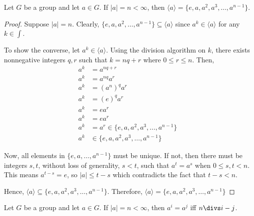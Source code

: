     \begin{thm}
        Let \(G\) be a group and let \(a\in G\). If \(|a| = n < \infty\), then \(\langle a \rangle = \{e, a, a^2, a^3, \ldots, a^{n - 1}\}\).
    \end{thm}

    \begin{proof}
        Suppose \(|a| = n\). Clearly, \(\{e, a, a^2, \ldots, a^{n -1}\} \subseteq \langle a \rangle\) since \(a^k \in \langle a \rangle\) for any \(k\in\int\).

        To show the converse, let \(a^k \in \langle a \rangle\). Using the division algorithm on \(k\), there exists nonnegative integers \(q, r\) such that \(k = nq + r\) where \(0 \leq r \leq n\). Then,
        \begin{align*}
            a^k &= a^{nq + r} \\
            a^k &= a^{nq}a^r \\
            a^k &= (a^{n})^q a^r \\
            a^k &= (e)^q a^r \\
            a^k &= e a^r \\
            a^k &= e a^r \\
            a^k &= a^r \in \{e, a, a^2, a^3, \ldots, a^{n - 1}\} \\
            a^k &\in \{e, a, a^2, a^3, \ldots, a^{n - 1}\}
        \end{align*}

        Now, all elements in \(\{e, a, \ldots, a^{n - 1}\}\) must be unique. If not, then there must be integers \(s, t\), without loss of generality, \(s < t\), such that \(a^t = a^s\) when \(0 \leq s, t < n\). This means \(a^{t - s} = e\), so \(|a| \leq t - s\) which contradicts the fact that \(t - s < n\).

        Hence, \(\langle a \rangle \subseteq \{e, a, a^2, a^3, \ldots, a^{n - 1}\}\). Therefore, \(\langle a \rangle = \{e, a, a^2, a^3, \ldots, a^{n - 1}\}\)
    \end{proof}
    
    \begin{thm}
        Let \(G\) be a group and let \(a \in G\). If \(|a| = n < \infty\), then \(a^i = a^j\) iff \(n \divs i - j\).
    \end{thm}

